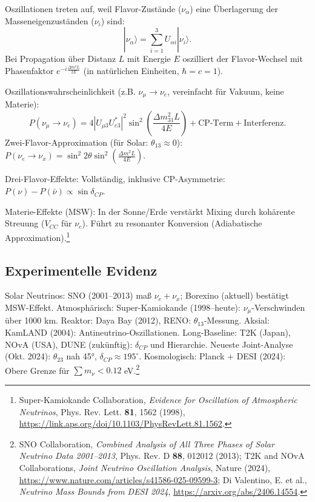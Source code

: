 	Oszillationen treten auf, weil Flavor-Zustände ($\nu_\alpha$) eine Überlagerung der Masseneigenzuständen ($\nu_i$) sind:
	\begin{equation}
		|\nu_\alpha\rangle = \sum_{i=1}^3 U_{\alpha i} |\nu_i\rangle.
		\label{eq:flavorueberlagerung}
	\end{equation}
	Bei Propagation über Distanz $L$ mit Energie $E$ oszilliert der Flavor-Wechsel mit Phasenfaktor $ e^{-i \frac{\Delta m^2 L}{2E}} $ (in natürlichen Einheiten, $\hbar=c=1$).
	
	Oszillationswahrscheinlichkeit (z.B. $\nu_\mu \to \nu_e$, vereinfacht für Vakuum, keine Materie):
	\begin{equation}
		P(\nu_\mu \to \nu_e) = 4 |U_{\mu 3} U_{e 3}^*|^2 \sin^2 \left( \frac{\Delta m_{31}^2 L}{4E} \right) + \text{CP-Term} + \text{Interferenz}.
		\label{eq:oszprob}
	\end{equation}
	Zwei-Flavor-Approximation (für Solar: $\theta_{13}\approx0$): $ P(\nu_e \to \nu_x) = \sin^2 2\theta \sin^2 \left( \frac{\Delta m^2 L}{4E} \right) $.
	
	Drei-Flavor-Effekte: Vollständig, inklusive CP-Asymmetrie: $ P(\nu) - P(\bar{\nu}) \propto \sin \delta_{CP} $.
	
	Materie-Effekte (MSW): In der Sonne/Erde verstärkt Mixing durch kohärente Streuung ($V_{CC}$ für $\nu_e$). Führt zu resonanter Konversion (Adiabatische Approximation).\footnote{Super-Kamiokande Collaboration, \emph{Evidence for Oscillation of Atmospheric Neutrinos}, Phys. Rev. Lett. \textbf{81}, 1562 (1998), \url{https://link.aps.org/doi/10.1103/PhysRevLett.81.1562}.}
	
	\subsection{Experimentelle Evidenz}
	
	Solar Neutrinos: SNO (2001--2013) maß $\nu_e + \nu_x$; Borexino (aktuell) bestätigt MSW-Effekt. Atmosphärisch: Super-Kamiokande (1998--heute): $\nu_\mu$-Verschwinden über 1000 km. Reaktor: Daya Bay (2012), RENO: $\theta_{13}$-Messung. Aksial: KamLAND (2004): Antineutrino-Oszillationen. Long-Baseline: T2K (Japan), NOvA (USA), DUNE (zukünftig): $\delta_{CP}$ und Hierarchie. Neueste Joint-Analyse (Okt. 2024): $\theta_{23}$ nah 45°, $\delta_{CP} \approx 195^\circ$. Kosmologisch: Planck + DESI (2024): Obere Grenze für $\sum m_\nu < 0.12$ eV.\footnote{SNO Collaboration, \emph{Combined Analysis of All Three Phases of Solar Neutrino Data 2001--2013}, Phys. Rev. D \textbf{88}, 012012 (2013); T2K and NOvA Collaborations, \emph{Joint Neutrino Oscillation Analysis}, Nature (2024), \url{https://www.nature.com/articles/s41586-025-09599-3}; Di Valentino, E. et al., \emph{Neutrino Mass Bounds from DESI 2024}, \url{https://arxiv.org/abs/2406.14554}.}
	
